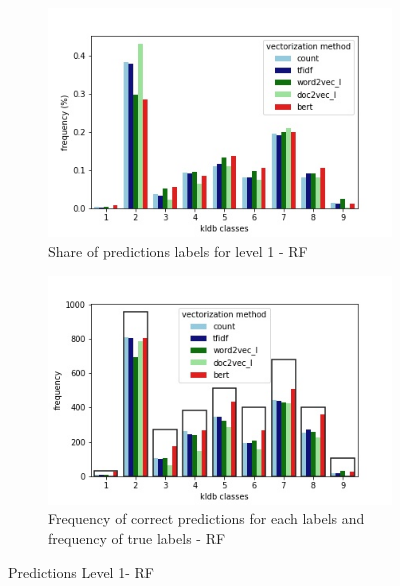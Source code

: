 \documentclass[12pt, a4paper, titlepage]{article}
\begin{document}
\begin{figure}[hb!]
  \centering
  \begin{subfigure}[b]{0.475\textwidth}
      \centering
      \includegraphics[width=\textwidth]{predictions_RF.jpg}
      {
        {\bigskip
          \small Share of predictions labels for level 1 - RF}
      }    
  \end{subfigure}
  \hfill
  \begin{subfigure}[b]{0.475\textwidth}  
      \centering 
      \includegraphics[width=\textwidth]{predictions_correct_relative_RF.jpg}
      {{\small Frequency of correct predictions for each labels and frequency of true labels - \ac{RF}}}    
  \end{subfigure}
\caption{\label{fig: F18} Predictions Level 1- RF}
\end{figure}
\end{document}

